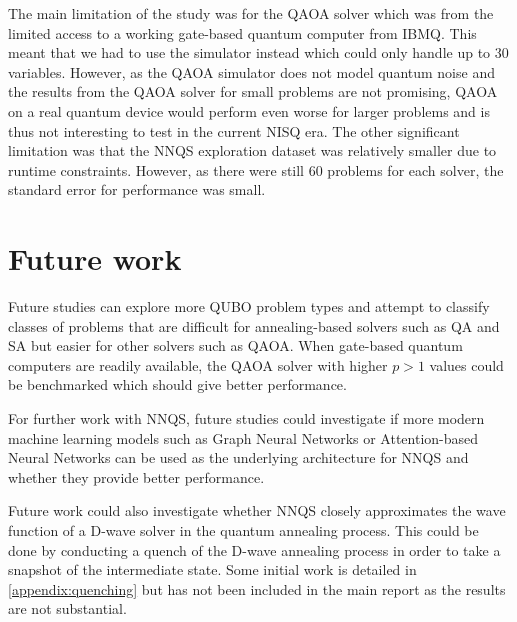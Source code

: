 The main limitation of the study was for the QAOA solver which was from the limited access to a working gate-based quantum computer from IBMQ. This meant that we had to use the simulator instead which could only handle up to $30$ variables. However, as the QAOA simulator does not model quantum noise and the results from the QAOA solver for small problems are not promising, QAOA on a real quantum device would perform even worse for larger problems and is thus not interesting to test in the current NISQ era. The other significant limitation was that the NNQS exploration dataset was relatively smaller due to runtime constraints. However, as there were still $60$ problems for each solver, the standard error for performance was small.

\section{Future work}
Future studies can explore more QUBO problem types and attempt to classify classes of problems that are difficult for annealing-based solvers such as QA and SA but easier for other solvers such as QAOA. When gate-based quantum computers are readily available, the QAOA solver with higher $p > 1$ values could be benchmarked which should give better performance.

For further work with NNQS, future studies could investigate if more modern machine learning models such as Graph Neural Networks or Attention-based Neural Networks can be used as the underlying architecture for NNQS and whether they provide better performance.

Future work could also investigate whether NNQS closely approximates the wave function of a D-wave solver in the quantum annealing process. This could be done by conducting a quench of the D-wave annealing process in order to take a snapshot of the intermediate state. Some initial work is detailed in \autoref{appendix:quenching} but has not been included in the main report as the results are not substantial.